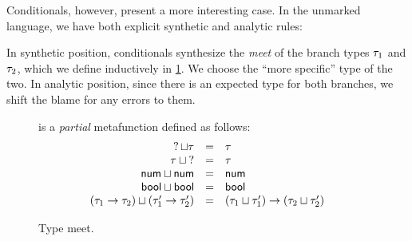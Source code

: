 Conditionals, however, present a more interesting case. In the unmarked language, we have both explicit
synthetic and analytic rules:
%
\begin{mathpar}

\end{mathpar}
%
In synthetic position, conditionals synthesize the \emph{meet} of the branch types $\TMV_1$ and
$\TMV_2$, which we define inductively in \cref{fig:calculus-type-meet}. We choose the ``more
specific'' type of the two. In analytic position, since
there is an expected type for both branches, we shift the blame for any errors to them.

\newcommand{\meetsTo}[3]{\ensuremath{\TMeet{#1}{#2} & = & #3}}
\begin{figure}[htbp]
  \raggedright
   is a \emph{partial} metafunction defined as follows:
  \[\begin{array}{rcl}
    \meetsTo{\TUnknown}{\TMV}{\TMV} \\
    \meetsTo{\TMV}{\TUnknown}{\TMV} \\
    \meetsTo{\TNum}{\TNum}{\TNum} \\
    \meetsTo{\TBool}{\TBool}{\TBool} \\
    \meetsTo{(\TArrow{\TMV_1}{\TMV_2})}{(\TArrow{\TMV_1'}{\TMV_2'})}{\TArrow{(\TMeet{\TMV_1}{\TMV_1'})}{(\TMeet{\TMV_2}{\TMV_2'})}}
  \end{array}\]
  \vspace{-10px}
  \caption{Type meet.}
  \label{fig:calculus-type-meet}
\end{figure}

